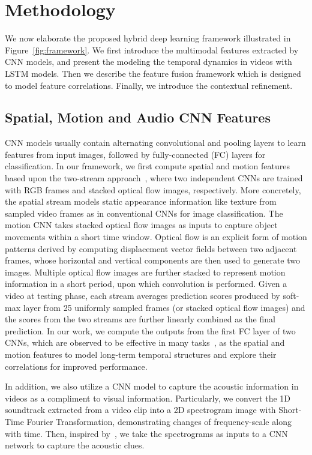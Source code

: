 \documentclass[journal]{IEEEtran}
\begin{document}
\section{Methodology}
\label{sec:method}
We now elaborate the proposed hybrid deep learning framework illustrated in Figure~\ref{fig:framework}. We first introduce the multimodal features extracted by CNN models, and present the modeling the temporal dynamics in videos with LSTM models. Then we describe the feature fusion framework which is designed to model feature correlations. Finally, we introduce the contextual refinement.

\subsection{Spatial, Motion and Audio CNN Features}
CNN models usually contain alternating convolutional and pooling layers to learn features from input images, followed by fully-connected (FC) layers for classification. In our framework, we first compute spatial and motion features based upon the two-stream approach~\cite{DBLP:conf/nips/SimonyanZ14}, where two independent CNNs are trained with RGB frames and stacked optical flow images, respectively. More concretely, the spatial stream models static appearance information like texture  from sampled video frames as in conventional CNNs for image classification. The motion CNN takes stacked optical flow images as inputs to capture object movements within a short time window. Optical flow is an explicit form of motion patterns derived by computing displacement vector fields between two adjacent frames, whose horizontal and vertical components are then used to generate two images. Multiple optical flow images are further stacked to represent motion information in a short period, upon which convolution is performed. Given a video at testing phase, each stream averages prediction scores produced by soft-max layer from 25 uniformly sampled frames (or stacked optical flow images) and the scores from the two streams are further linearly combined as the final prediction. In our work, we compute the outputs from the first FC layer of two CNNs, which are observed to be effective in many tasks~\cite{Razavian2014}, as the spatial and motion features to model long-term temporal structures and explore their correlations for improved performance. 

In addition, we also utilize a CNN model to capture the acoustic information in videos as a compliment to visual information. Particularly, we convert the 1D soundtrack extracted from a video clip into a 2D spectrogram image with Short-Time Fourier Transformation, demonstrating changes of frequency-scale along with time. Then, inspired by~\cite{VandenOord2013}, we take the spectrograms as inputs to a CNN network to capture the acoustic clues.
\end{document}
